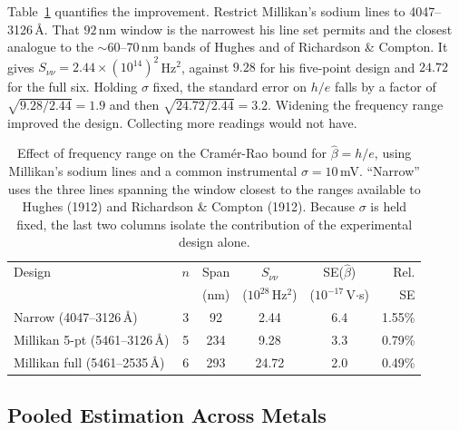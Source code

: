 \documentclass[12pt]{article}
\begin{document}
Table~\ref{tab:crb_comparison} quantifies the improvement.  Restrict Millikan's
sodium lines to 4047--3126\,\AA.  That $92$\,nm window is the narrowest his
line set permits and the closest analogue to the $\sim$60--70\,nm bands of
Hughes and of Richardson \& Compton.  It gives
$S_{\nu\nu} = 2.44\times(10^{14})^2$\,Hz$^2$, against $9.28$ for his
five-point design and $24.72$ for the full six.  Holding $\sigma$ fixed, the
standard error on $h/e$ falls by a factor of $\sqrt{9.28/2.44} = 1.9$ and
then $\sqrt{24.72/2.44} = 3.2$.  Widening the frequency range improved the
design.  Collecting more readings would not have.

\begin{table}[ht]
\centering
\caption{Effect of frequency range on the Cram\'er-Rao bound for
$\hat\beta = h/e$, using Millikan's sodium lines and a common instrumental
$\sigma = 10$\,mV.  ``Narrow'' uses the three lines spanning the window
closest to the ranges available to Hughes (1912) and Richardson \& Compton
(1912).  Because $\sigma$ is held fixed, the last two columns isolate the
contribution of the experimental design alone.}
\label{tab:crb_comparison}
\small
\begin{tabular}{lccccr}
\toprule
Design & $n$ & Span & $S_{\nu\nu}$ & SE($\hat\beta$) & Rel. \\
 & & (nm) & ($10^{28}$\,Hz$^2$) & ($10^{-17}$\,V$\cdot$s) & SE \\
\midrule
Narrow (4047--3126\,\AA)        & 3 & 92  & 2.44  & 6.4 & 1.55\% \\
Millikan 5-pt (5461--3126\,\AA) & 5 & 234 & 9.28  & 3.3 & 0.79\% \\
Millikan full (5461--2535\,\AA) & 6 & 293 & 24.72 & 2.0 & 0.49\% \\
\bottomrule
\end{tabular}
\end{table}

\subsection{Pooled Estimation Across Metals}
\label{sec:panel}
\end{document}
